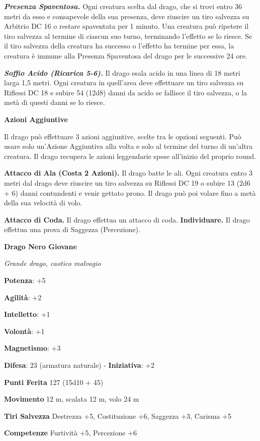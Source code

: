 \begin{multicols}{2}
\emph{\textbf{Presenza Spaventosa.}} Ogni creatura scelta dal drago, che
si trovi entro 36 metri da esso e consapevole della sua presenza, deve
riuscire un tiro salvezza su Arbitrio DC 16 o restare spaventata per 1
minuto. Una creatura può ripetere il tiro salvezza al termine di ciascun
suo turno, terminando l'effetto se lo riesce. Se il tiro salvezza della
creatura ha successo o l'effetto ha termine per essa, la creatura è
immune alla Presenza Spaventosa del drago per le successive 24 ore.

\emph{\textbf{Soffio Acido (Ricarica 5-6).}} Il drago esala acido in una
linea di 18 metri larga 1,5 metri. Ogni creatura in quell'area deve
effettuare un tiro salvezza su Riflessi DC 18 e subire 54 (12d8) danni
da acido se fallisce il tiro salvezza, o la metà di questi danni se lo
riesce.

\textbf{Azioni Aggiuntive}

Il drago può effettuare 3 azioni aggiuntive, scelte tra le opzioni
seguenti. Può usare solo un'Azione Aggiuntiva alla volta e solo al
termine del turno di un'altra creatura. Il drago recupera le azioni
leggendarie spese all'inizio del proprio round.

\textbf{Attacco di Ala (Costa 2 Azioni).} Il drago batte le ali. Ogni
creatura entro 3 metri dal drago deve riuscire un tiro salvezza su Riflessi DC 19 o subire 13 (2d6 + 6) danni contundenti e venir gettato
prono. Il drago può poi volare fino a metà della sua velocità di volo.

\textbf{Attacco di Coda.} Il drago effettua un attacco di coda.
\textbf{Individuare.} Il drago effettua una prova di Saggezza
(Percezione).

\textbf{Drago Nero Giovane}

\emph{Grande drago, caotico malvagio}

\textbf{Potenza}: +5

\textbf{Agilità}: +2

\textbf{Intelletto}: +1

\textbf{Volontà}: +1

\textbf{Magnetismo}: +3

\textbf{Difesa}: 23 (armatura naturale) - \textbf{Iniziativa}: +2

\textbf{Punti Ferita} 127 (15d10 + 45)

\textbf{Movimento} 12 m, scalata 12 m, volo 24 m

\textbf{Tiri Salvezza} Destrezza +5, Costituzione +6, Saggezza +3,
Carisma +5

\textbf{Competenze} Furtività +5, Percezione +6


\end{multicols}
